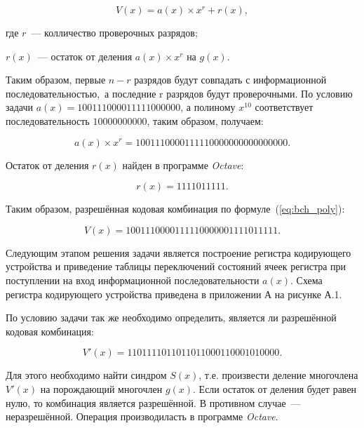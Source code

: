 \begin{equation}
  \label{eq:bch_poly}
  V(x) = a(x) \times x^r + r(x),
\end{equation}


\begin{ESKDexplanation}
\item[где ] $r$~--- колличество проверочных разрядов;
\item $r(x)$~--- остаток от деления $a(x) \times x^r$ на $g(x)$.
\end{ESKDexplanation}

Таким образом, первые $n-r$ разрядов будут совпадать с
информационной последовательностью,~а последние r разрядов будут
проверочными. По условию задачи $a(x) = 100111000011111000000$, а
полиному $x^{10}$ соответствует последовательность $10000000000$,
таким образом, получаем:

\begin{equation*}
  a(x) \times x^r = 1001110000111110000000000000000.
\end{equation*}

Остаток от деления $r(x)$ найден в программе \textit{Octave}:

\begin{equation*}
r(x) = 1111011111.
\end{equation*}


Таким образом, разрешённая кодовая комбинация по
формуле~(\ref{eq:bch_poly}):

\begin{equation*}
  V(x) = 1001110000111110000001111011111.
\end{equation*}

Следующим этапом решения задачи является построение регистра
кодирующего устройства и приведение таблицы переключений состояний
ячеек регистра при поступлении на вход информационной
последовательности $a(x)$. Схема регистра кодирующего устройства
приведена в приложении А на рисунке А.1.

По условию задачи так же необходимо определить, является ли разрешённой
кодовая комбинация:

\begin{equation*}
  V'(x) = 1101111011011011000110001010000.
\end{equation*}

Для этого необходимо найти синдром $S(x)$, т.е.  произвести деление
многочлена $V'(x)$ на порождающий многочлен $g(x)$. Если остаток от
деления будет равен нулю, то комбинация является разрешённой.  В
противном случае~--- неразрешённой. Операция производиласть в
программе \textit{Octave}.

